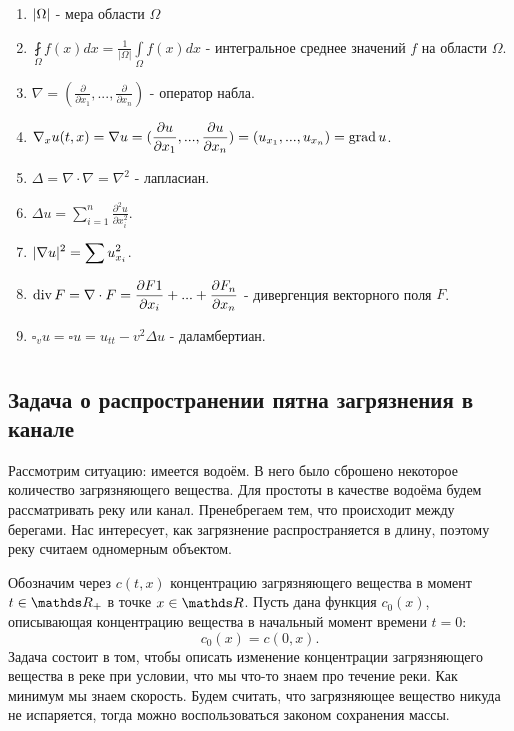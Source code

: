 \begin{enumerate}
\item $\lvert\Omega\rvert$ - мера области $\Omega$
\item $\displaystyle \fint \limits_{\Omega} f(x) dx = \frac{1}{|\Omega|} \int \limits_{\Omega} f(x) dx$ - интегральное среднее значений $f$ на области $\Omega$.
\item $\displaystyle \nabla = (\frac {\partial} {\partial x_1}, ... , \frac {\partial} {\partial x_n}) $ - оператор набла.
\item $\displaystyle \nabla_x u(t,x)  = \nabla u = (\frac {\partial u} {\partial x_1}, ..., \frac {\partial u} {\partial x_n}) = (u_{x_1}, ..., u_{x_n}) = \operatorname{grad} u $.
\item $\displaystyle \Delta = \nabla \cdot \nabla = \nabla^2$ - лапласиан.
\item $\displaystyle \Delta u = \sum \limits_{i=1}^n \frac {\partial^2 u} {\partial x_i^2}$.
\item $\displaystyle \lvert\nabla u\rvert^2 = \sum u_{x_i}^2$.
\item $\displaystyle \operatorname{div} F = \nabla \cdot F = \frac {\partial F1} {\partial x_i} + ... + \frac {\partial F_n} {\partial x_n}$ - дивергенция векторного поля $F$.
\item $\square_v u = \square u = u_{tt} - v^2 \Delta u$ - даламбертиан.

\end{enumerate}

\chapter{}
\section{Задача о распространении пятна загрязнения в канале}
Рассмотрим ситуацию: имеется водоём. В него было сброшено некоторое количество загрязняющего вещества.
Для простоты в качестве водоёма будем рассматривать реку или канал. Пренебрегаем тем, что происходит между берегами. Нас интересует, как загрязнение распространяется в длину, поэтому реку считаем одномерным объектом.

Обозначим через $c (t, x) $ концентрацию загрязняющего вещества в момент $t \in \real_+$ в точке $x \in \real$. Пусть дана функция $ c_0 (x) $, описывающая концентрацию вещества в начальный момент времени $ t = 0 $:
$$ c_0 (x) = c (0, x).$$
Задача состоит в том, чтобы описать изменение концентрации загрязняющего вещества в реке при условии, что мы что-то знаем про течение реки. Как минимум мы знаем скорость. Будем считать, что загрязняющее вещество никуда не испаряется, тогда можно воспользоваться законом сохранения массы.

